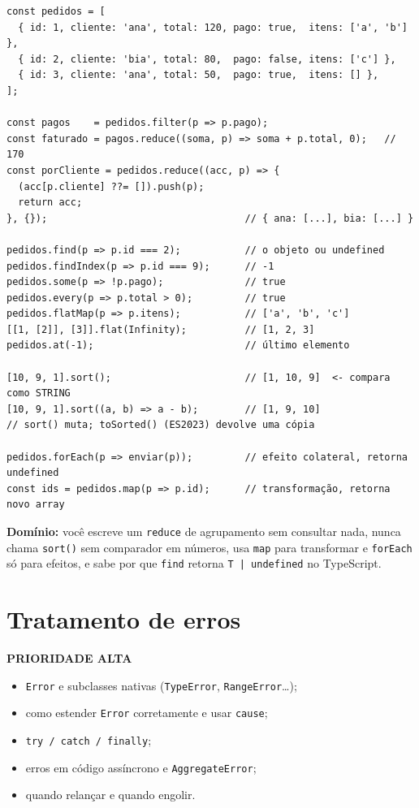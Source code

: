 \documentclass[12pt,a4paper,oneside]{book}
\newcommand{\alta}{\colorbox{red!15}{\sffamily\scriptsize\bfseries PRIORIDADE ALTA}}
\newcommand{\code}[1]{\texttt{#1}}
\newcommand{\dom}[1]{\begin{dominio}\textbf{Domínio:} #1\end{dominio}}
\begin{document}
\begin{verbatim}
const pedidos = [
  { id: 1, cliente: 'ana', total: 120, pago: true,  itens: ['a', 'b'] },
  { id: 2, cliente: 'bia', total: 80,  pago: false, itens: ['c'] },
  { id: 3, cliente: 'ana', total: 50,  pago: true,  itens: [] },
];

const pagos    = pedidos.filter(p => p.pago);
const faturado = pagos.reduce((soma, p) => soma + p.total, 0);   // 170
const porCliente = pedidos.reduce((acc, p) => {
  (acc[p.cliente] ??= []).push(p);
  return acc;
}, {});                                  // { ana: [...], bia: [...] }

pedidos.find(p => p.id === 2);           // o objeto ou undefined
pedidos.findIndex(p => p.id === 9);      // -1
pedidos.some(p => !p.pago);              // true
pedidos.every(p => p.total > 0);         // true
pedidos.flatMap(p => p.itens);           // ['a', 'b', 'c']
[[1, [2]], [3]].flat(Infinity);          // [1, 2, 3]
pedidos.at(-1);                          // último elemento

[10, 9, 1].sort();                       // [1, 10, 9]  <- compara como STRING
[10, 9, 1].sort((a, b) => a - b);        // [1, 9, 10]
// sort() muta; toSorted() (ES2023) devolve uma cópia

pedidos.forEach(p => enviar(p));         // efeito colateral, retorna undefined
const ids = pedidos.map(p => p.id);      // transformação, retorna novo array
\end{verbatim}

\dom{você escreve um \code{reduce} de agrupamento sem consultar nada, nunca chama \code{sort()} sem comparador em números, usa \code{map} para transformar e \code{forEach} só para efeitos, e sabe por que \code{find} retorna \code{T | undefined} no TypeScript.}

\section{Tratamento de erros}
\label{sec:erros}
\alta

\begin{itemize}
  \item \code{Error} e subclasses nativas (\code{TypeError}, \code{RangeError}\ldots);
  \item como estender \code{Error} corretamente e usar \code{cause};
  \item \code{try / catch / finally};
  \item erros em código assíncrono e \code{AggregateError};
  \item quando relançar e quando engolir.
\end{itemize}
\end{document}
